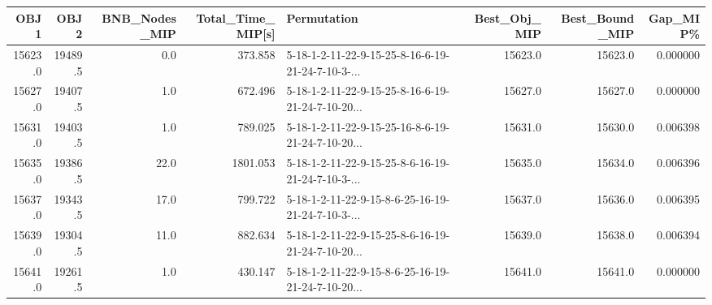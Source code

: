\begin{tabular}{rrrrlrrr}
\toprule
    OBJ1 &     OBJ2 &  BNB\_Nodes\_MIP &  Total\_Time\_MIP[s] &                                        Permutation &  Best\_Obj\_MIP &  Best\_Bound\_MIP &  Gap\_MIP\% \\
\midrule
 15623.0 &  19489.5 &            0.0 &            373.858 &  5-18-1-2-11-22-9-15-25-8-16-6-19-21-24-7-10-3-... &       15623.0 &         15623.0 &  0.000000 \\
 15627.0 &  19407.5 &            1.0 &            672.496 &  5-18-1-2-11-22-9-15-25-8-16-6-19-21-24-7-10-20... &       15627.0 &         15627.0 &  0.000000 \\
 15631.0 &  19403.5 &            1.0 &            789.025 &  5-18-1-2-11-22-9-15-25-16-8-6-19-21-24-7-10-20... &       15631.0 &         15630.0 &  0.006398 \\
 15635.0 &  19386.5 &           22.0 &           1801.053 &  5-18-1-2-11-22-9-15-25-8-6-16-19-21-24-7-10-3-... &       15635.0 &         15634.0 &  0.006396 \\
 15637.0 &  19343.5 &           17.0 &            799.722 &  5-18-1-2-11-22-9-15-8-6-25-16-19-21-24-7-10-3-... &       15637.0 &         15636.0 &  0.006395 \\
 15639.0 &  19304.5 &           11.0 &            882.634 &  5-18-1-2-11-22-9-15-25-8-6-16-19-21-24-7-10-20... &       15639.0 &         15638.0 &  0.006394 \\
 15641.0 &  19261.5 &            1.0 &            430.147 &  5-18-1-2-11-22-9-15-8-6-25-16-19-21-24-7-10-20... &       15641.0 &         15641.0 &  0.000000 \\
\bottomrule
\end{tabular}
